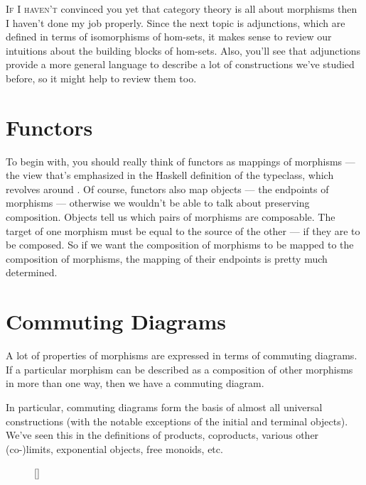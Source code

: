 \lettrine[lhang=0.17]{I}{f I haven't} convinced you yet that category theory is all about
morphisms then I haven't done my job properly. Since the next topic is
adjunctions, which are defined in terms of isomorphisms of hom-sets, it
makes sense to review our intuitions about the building blocks of
hom-sets. Also, you'll see that adjunctions provide a more general
language to describe a lot of constructions we've studied before, so it
might help to review them too.

\section{Functors}\label{functors}

To begin with, you should really think of functors as mappings of
morphisms --- the view that's emphasized in the Haskell definition of
the  typeclass, which revolves around . Of
course, functors also map objects --- the endpoints of morphisms ---
otherwise we wouldn't be able to talk about preserving composition.
Objects tell us which pairs of morphisms are composable. The target of
one morphism must be equal to the source of the other --- if they are to
be composed. So if we want the composition of morphisms to be mapped to
the composition of  morphisms, the mapping of their
endpoints is pretty much determined.

\section{Commuting Diagrams}\label{commuting-diagrams}

A lot of properties of morphisms are expressed in terms of commuting
diagrams. If a particular morphism can be described as a composition of
other morphisms in more than one way, then we have a commuting diagram.

In particular, commuting diagrams form the basis of almost all universal
constructions (with the notable exceptions of the initial and terminal
objects). We've seen this in the definitions of products, coproducts,
various other (co-)limits, exponential objects, free monoids, etc.

\begin{figure}
\raisebox{0pt}[\dimexpr{}\baselineskip\relax]{
}%
\end{figure}

